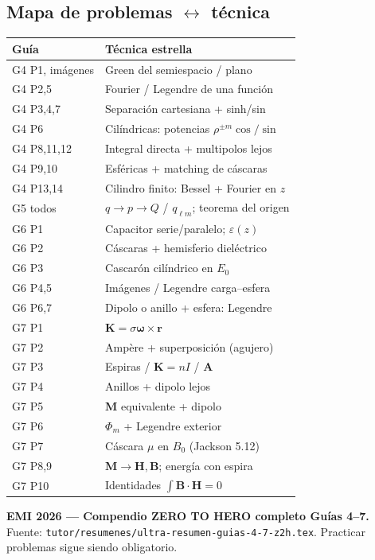 \documentclass[10pt,a4paper]{article}
\newcommand{\vect}[1]{\mathbf{#1}}
\newcommand{\eps}{\varepsilon}
\begin{document}
\subsection{Mapa de problemas $\leftrightarrow$ técnica}
\begin{center}
\small
\begin{tabular}{@{}lp{9.2cm}@{}}
\toprule
Guía & Técnica estrella\\
\midrule
G4 P1, imágenes & Green del semiespacio / plano\\
G4 P2,5 & Fourier / Legendre de una función\\
G4 P3,4,7 & Separación cartesiana + sinh/sin\\
G4 P6 & Cilíndricas: potencias $\rho^{\pm m}\cos/\sin$\\
G4 P8,11,12 & Integral directa + multipolos lejos\\
G4 P9,10 & Esféricas + matching de cáscaras\\
G4 P13,14 & Cilindro finito: Bessel + Fourier en $z$\\
G5 todos & $q\to p\to Q$ / $q_{\ell m}$; teorema del origen\\
G6 P1 & Capacitor serie/paralelo; $\eps(z)$\\
G6 P2 & Cáscaras + hemisferio dieléctrico\\
G6 P3 & Cascarón cilíndrico en $E_0$\\
G6 P4,5 & Imágenes / Legendre carga--esfera\\
G6 P6,7 & Dipolo o anillo + esfera: Legendre\\
G7 P1 & $\vect{K}=\sigma\boldsymbol{\omega}\times\vect{r}$\\
G7 P2 & Ampère + superposición (agujero)\\
G7 P3 & Espiras / $\vect{K}=nI$ / $\vect{A}$\\
G7 P4 & Anillos + dipolo lejos\\
G7 P5 & $\vect{M}$ equivalente + dipolo\\
G7 P6 & $\Phi_m$ + Legendre exterior\\
G7 P7 & Cáscara $\mu$ en $B_0$ (Jackson 5.12)\\
G7 P8,9 & $\vect{M}\to\vect{H},\vect{B}$; energía con espira\\
G7 P10 & Identidades $\int\vect{B}\cdot\vect{H}=0$\\
\bottomrule
\end{tabular}
\end{center}

\vspace{6pt}
\begin{center}\footnotesize
\textbf{EMI 2026 --- Compendio ZERO TO HERO completo Guías 4--7.}\\
Fuente: \texttt{tutor/resumenes/ultra-resumen-guias-4-7-z2h.tex}. Practicar problemas sigue siendo obligatorio.
\end{center}
\end{document}
